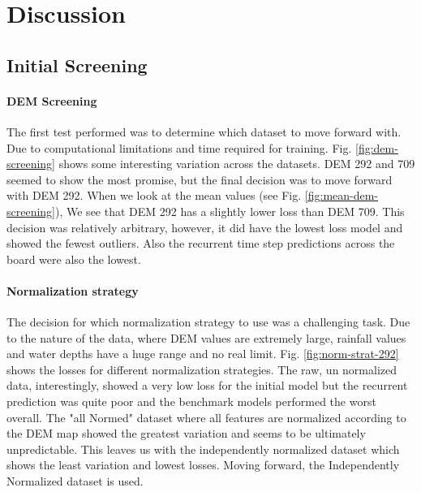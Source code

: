 
\chapter{Discussion} %
\label{Chapter6} %

\section{Initial Screening}
\subsubsection*{DEM Screening}
The first test performed was to determine which dataset to move forward with. Due to computational limitations and time required for training. Fig. \ref{fig:dem-screening} shows some interesting variation across the datasets. DEM 292 and 709 seemed to show the most promise, but the final decision was to move forward with DEM 292. When we look at the mean values (see Fig. \ref{fig:mean-dem-screening}), We see that DEM 292 has a slightly lower loss than DEM 709. This decision was relatively arbitrary, however, it did have the lowest loss model and showed the fewest outliers. Also the recurrent time step predictions across the board were also the lowest.

\subsubsection*{Normalization strategy}
The decision for which normalization strategy to use was a challenging task. Due to the nature of the data, where DEM values are extremely large, rainfall values and water depths have a huge range and no real limit. Fig. \ref{fig:norm-strat-292} shows the losses for different normalization strategies. The raw, un normalized data, interestingly, showed a very low loss for the initial model but the recurrent prediction was quite poor and the benchmark models performed the worst overall. The "all Normed" dataset where all features are normalized according to the DEM map showed the greatest variation and seems to be ultimately unpredictable. This leaves us with the independently normalized dataset which shows the least variation and lowest losses. Moving forward, the Independently Normalized dataset is used.

